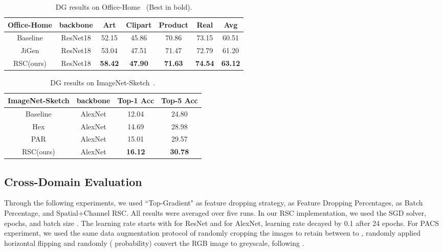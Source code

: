 \documentclass[runningheads]{llncs}
\begin{document}
\begin{table}[!htb]
\footnotesize
\centering \fontsize{7}{8}\selectfont
\begin{tabular}{c| c| c| c| c| c|| c } \hline Office-Home & backbone & Art & Clipart & Product & Real & Avg  \\ [0.5ex] \hline\hline Baseline\cite{carlucci2019domain} & ResNet18 & 52.15 & 45.86 & 70.86 &73.15 & 60.51\\ JiGen\cite{carlucci2019domain} & ResNet18 & 53.04 & 47.51 & 71.47 &72.79 & 61.20 \\ RSC(ours) & ResNet18 & \textbf{58.42} & \textbf{47.90} & \textbf{71.63} & \textbf{74.54}& \textbf{63.12} \\ \hline 
\end{tabular}
\vspace{0.5em}
\caption{DG results on Office-Home~\cite{venkateswara2017deep} (Best in bold).} \vspace{-1em}
\label{table:Office} \end{table}

\begin{table}[!htb]
\footnotesize
\centering \fontsize{7}{8}\selectfont
\begin{tabular}{c| c| c| c } \hline ImageNet-Sketch & backbone & Top-1 Acc  & Top-5 Acc \\ [0.5ex] \hline\hline Baseline\cite{wang2018learning} & AlexNet & 12.04  & 24.80\\ 
Hex\cite{wang2018learning} & AlexNet & 14.69  & 28.98\\ 
PAR \cite{wang2019learning} & AlexNet & 15.01  & 29.57 \\ 
RSC(ours) & AlexNet & \textbf{16.12}  & \textbf{30.78}\\
\hline 
\end{tabular}
\vspace{0.5em}
\caption{DG results on ImageNet-Sketch~\cite{wang2019learning}. } \vspace{-1em}
\label{table:sketch} \end{table}


\subsection{Cross-Domain Evaluation}




Through the following experiments, we used ``Top-Gradient" as feature dropping strategy,  as Feature Dropping Percentages,  as Batch Percentage, and Spatial+Channel RSC. All results were averaged over five runs. 
In our RSC implementation, we used the SGD solver,  epochs, and batch size . The learning rate starts with  for ResNet and  for AlexNet, learning rate decayed by 0.1 after 24 epochs. For PACS experiment, we used the same data augmentation protocol of randomly cropping the images to retain between  to , randomly applied horizontal flipping and randomly ( probability) convert the RGB image to greyscale, following \cite{carlucci2019domain}. 
\end{document}
